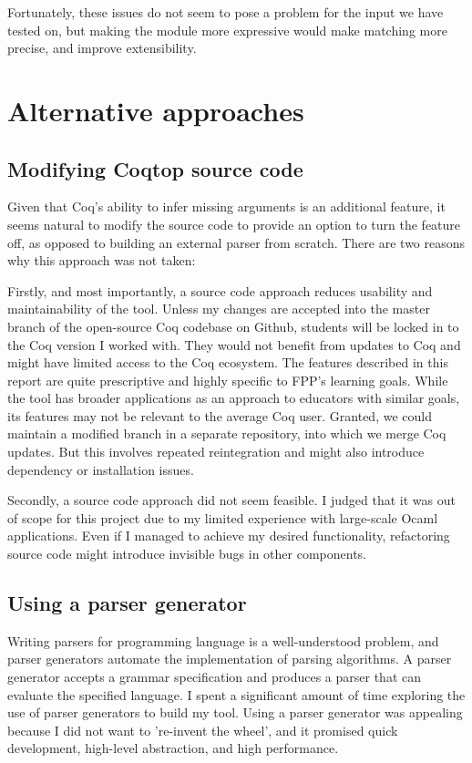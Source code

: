 Fortunately, these issues do not seem to pose a problem for the input we have tested on, but making the module more expressive would make matching more precise, and improve extensibility.

\section{Alternative approaches}

\subsection{Modifying Coqtop source code}
Given that Coq's ability to infer missing arguments is an additional feature, it seems natural to modify the source code to provide an option to turn the feature off, as opposed to building an external parser from scratch. There are two reasons why this approach was not taken:

Firstly, and most importantly, a source code approach reduces usability and maintainability of the tool. Unless my changes are accepted into the master branch of the open-source Coq codebase on Github, students will be locked in to the Coq version I worked with. They would not benefit from updates to Coq and might have limited access to the Coq ecosystem. The features described in this report are quite prescriptive and highly specific to FPP's learning goals. While the tool has broader applications as an approach to educators with similar goals, its features may not be relevant to the average Coq user. Granted, we could maintain a modified branch in a separate repository, into which we merge Coq updates. But this involves repeated reintegration and might also introduce dependency or installation issues.

Secondly, a source code approach did not seem feasible. I judged that it was out of scope for this project due to my limited experience with large-scale Ocaml applications. Even if I managed to achieve my desired functionality, refactoring source code might introduce invisible bugs in other components.


\subsection{Using a parser generator}
\label{using-parser-generator}
Writing parsers for programming language is a well-understood problem, and parser generators automate the implementation of parsing algorithms. A parser generator accepts a grammar specification and produces a parser that can evaluate the specified language. I spent a significant amount of time exploring the use of parser generators to build my tool. Using a parser generator was appealing because I did not want to 're-invent the wheel', and it promised quick development, high-level abstraction, and high performance.

